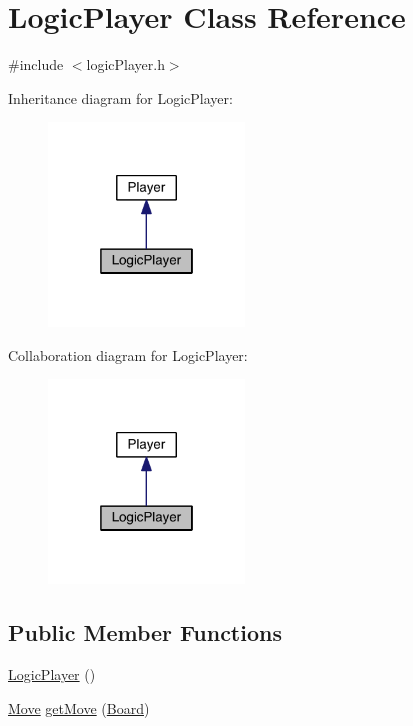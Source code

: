 \hypertarget{class_logic_player}{}\section{Logic\+Player Class Reference}
\label{class_logic_player}


{\ttfamily \#include $<$logic\+Player.\+h$>$}



Inheritance diagram for Logic\+Player\+:\nopagebreak
\begin{figure}[H]
\begin{center}
\leavevmode
\includegraphics[width=148pt]{class_logic_player__inherit__graph}
\end{center}
\end{figure}


Collaboration diagram for Logic\+Player\+:\nopagebreak
\begin{figure}[H]
\begin{center}
\leavevmode
\includegraphics[width=148pt]{class_logic_player__coll__graph}
\end{center}
\end{figure}
\subsection*{Public Member Functions}
\begin{DoxyCompactItemize}
\item 
\hyperlink{class_logic_player_a9a046e3f4019b241611ba08bd9e3a2c2}{Logic\+Player} ()
\item 
\hyperlink{struct_move}{Move} \hyperlink{class_logic_player_a43a34db899e75294d73c18477c139e6a}{get\+Move} (\hyperlink{constants_8h_af901d0acc1572fb0c779f84ddd2c6ce8}{Board})
\end{DoxyCompactItemize}


